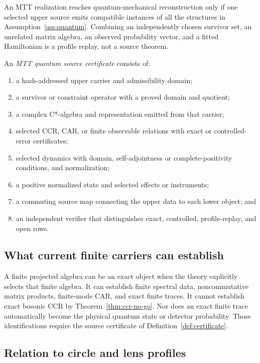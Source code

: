\documentclass[11pt]{article}
\begin{document}
An MTT realization reaches quantum-mechanical reconstruction only if one
selected upper source emits compatible instances of all the structures in
Assumption~\ref{ass:quantum}.  Combining an independently chosen survivor set,
an unrelated matrix algebra, an observed probability vector, and a fitted
Hamiltonian is a profile replay, not a source theorem.

\begin{definition}\label{def:certificate}
An \emph{MTT quantum source certificate} consists of:
\begin{enumerate}
\item a hash-addressed upper carrier and admissibility domain;
\item a survivor or constraint operator with a proved domain and quotient;
\item a complex C*-algebra and representation emitted from that carrier;
\item selected CCR, CAR, or finite observable relations with exact or
controlled-error certificates;
\item selected dynamics with domain, self-adjointness or complete-positivity
conditions, and normalization;
\item a positive normalized state and selected effects or instruments;
\item a commuting source map connecting the upper data to each lower object;
and
\item an independent verifier that distinguishes exact, controlled,
profile-replay, and open rows.
\end{enumerate}
\end{definition}

\subsection{What current finite carriers can establish}

A finite projected algebra can be an exact object when the theory explicitly
selects that finite algebra.  It can establish finite spectral data,
noncommutative matrix products, finite-mode CAR, and exact finite traces.
It cannot establish exact bosonic CCR by
Theorem~\ref{thm:ccr-no-go}.  Nor does an exact finite trace automatically
become the physical quantum state or detector probability.  Those
identifications require the source certificate of
Definition~\ref{def:certificate}.

\subsection{Relation to circle and lens profiles}
\end{document}
